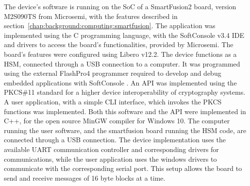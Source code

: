 The device's software is running on the \ac{SoC} of a SmartFusion2 board, version M2S090TS from Microsemi, with the features described in section~\ref{chap:background:computing:smartfusion}.
The application was implemented using the C programming language, with the SoftConsole v3.4 \ac{IDE} and drivers to access the board's functionalities, provided by Microsemi. The board's features were configured using Libero v12.2.
The device functions as a \ac{HSM}, connected through a \ac{USB} connection to a computer. It was programmed using the external FlashPro4 programmer required to develop and debug embedded applications with SoftConsole \cite{smartfusionSecurityPractices}.
An API was implemented using the \ac{PKCS}\#11 standard for a higher device interoperability of cryptography systems. A user application, with a simple CLI interface, which invokes the PKCS functions was implemented. Both this software and the API were implemented in C++, for the open source MinGW compiler for Windows 10.
The computer running the user software, and the smartfusion board running the HSM code, are connected through a \ac{USB} connection.
The device implementation uses the available \ac{UART} communication controller and corresponding drivers for communications, while the user application uses the windows drivers to communicate with the corresponding serial port.
This setup allows the board to send and receive messages of 16 byte blocks at a time.


